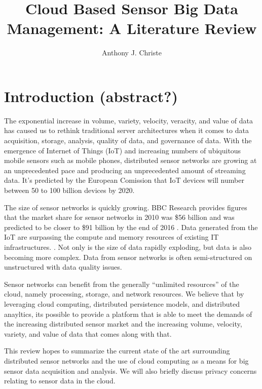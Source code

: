 \documentclass[twocolumn]{article}
\title{Cloud Based Sensor Big Data Management: A Literature Review}
\author{Anthony J. Christe}
\begin{document}
\maketitle

\begin{abstract}

\end{abstract}

\section{Introduction (abstract?)}
The exponential increase in volume, variety, velocity, veracity, and value of data has caused us to rethink traditional server architectures when it comes to data acquisition, storage, analysis, quality of data, and governance of data. With the emergence of Internet of Things (IoT) and increasing numbers of ubiquitous mobile sensors such as mobile phones, distributed sensor networks are growing at an unprecedented pace and producing an unprecedented amount of streaming data. It's predicted by the European Comission that IoT devices will number between 50 to 100 billion devices by 2020\cite{6072197}.

The size of sensor networks is quickly growing. BBC Research provides figures that the market share for sensor networks in 2010 was \$56 billion and was predicted to be closer to \$91 billion by the end of 2016 \cite{zaslavsky_sensing_2013}. Data generated from the IoT are surpassing the compute and memory resources of existing IT infrastructures. \cite{chen_big_2014}. Not only is the size of data rapidly exploding, but data is also becoming more complex. Data from sensor networks is often semi-structured on unstructured with data quality issues. 

Sensor networks can benefit from the generally ``unlimited resources'' of the cloud, namely processing, storage, and network resources. We believe that by leveraging cloud computing, distributed persistence models, and distributed anayltics, its possible to provide a platform that is able to meet the demands of the increasing distributed sensor market and the increasing volume, velocity, variety, and value of data that comes along with that. 

This review hopes to summarize the current state of the art surrounding distributed sensor networks and the use of cloud computing as a means for big sensor data acquisition and analysis. We will also briefly discuss privacy concerns relating to sensor data in the cloud.
\end{document}
